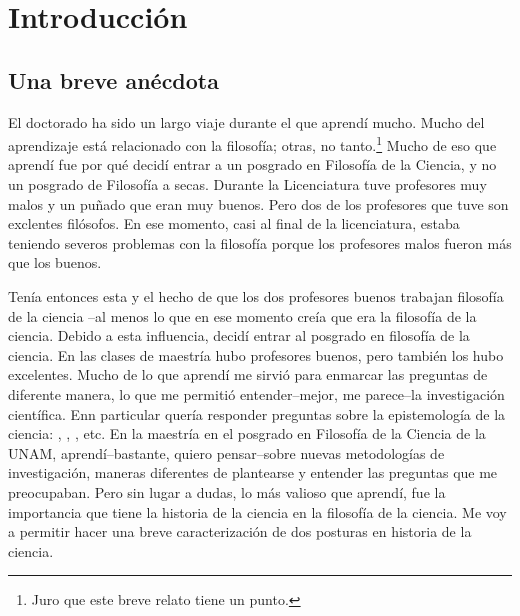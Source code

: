 
\chapter{Introducción}
\label{ch:introduction}


\section{Una breve anécdota}

\noindent El doctorado ha sido un largo viaje durante el que aprendí mucho.
Mucho del aprendizaje está relacionado con la filosofía; otras, no tanto.\footnote{Juro que este breve relato tiene un punto.}
Mucho de eso que aprendí fue por qué decidí entrar a un posgrado en Filosofía de la Ciencia, y no un posgrado de Filosofía a secas.
Durante la Licenciatura tuve profesores muy malos y un puñado que eran muy buenos.
Pero dos de los profesores que tuve son exclentes filósofos.
En ese momento, casi al final de la licenciatura, estaba teniendo severos problemas con la filosofía porque los profesores malos fueron más que los buenos.

Tenía entonces esta  y el hecho de que los dos profesores buenos trabajan filosofía de la ciencia --al menos lo que en ese momento creía que era la filosofía de la ciencia.
Debido a esta influencia, decidí entrar al posgrado en filosofía de la ciencia.
En las clases de maestría hubo profesores buenos, pero también los hubo excelentes.
Mucho de lo que aprendí me sirvió para enmarcar las preguntas de diferente manera, lo que me permitió entender--mejor, me parece--la investigación científica.
Enn particular quería responder preguntas sobre la epistemología de la ciencia: , , , etc.
En la maestría en el posgrado en Filosofía de la Ciencia de la UNAM, aprendí--bastante, quiero pensar--sobre nuevas metodologías de investigación, maneras diferentes de plantearse y entender las preguntas que me preocupaban.
Pero sin lugar a dudas, lo más valioso que aprendí, fue la importancia que tiene la historia de la ciencia en la filosofía de la ciencia.
Me voy a permitir hacer una breve caracterización de dos posturas en historia de la ciencia.


